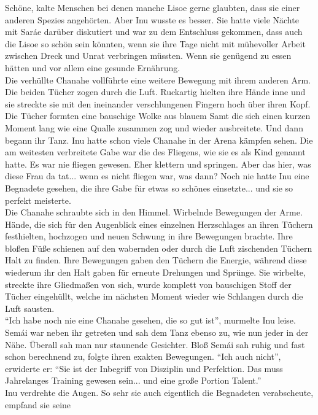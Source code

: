 Schöne, kalte Menschen bei denen manche Lisoe gerne glaubten, dass sie einer anderen Spezies 
angehörten. Aber Inu wusste es besser. Sie hatte viele Nächte mit Saráe darüber diskutiert und war 
zu dem Entschluss gekommen, dass auch die Lisoe so schön sein könnten, wenn sie ihre Tage nicht mit 
mühevoller Arbeit zwischen Dreck und Unrat verbringen müssten. Wenn sie genügend zu essen hätten 
und vor allem eine gesunde Ernährung. \\
Die verhüllte Chanahe vollführte eine weitere Bewegung mit ihrem anderen Arm. Die beiden Tücher 
zogen durch die Luft. Ruckartig hielten ihre Hände inne und sie streckte sie mit den ineinander 
verschlungenen Fingern hoch über ihren Kopf. Die Tücher formten eine bauschige Wolke aus blauem 
Samt die sich einen kurzen Moment lang wie eine Qualle zusammen zog und wieder ausbreitete. Und 
dann begann ihr Tanz. Inu hatte schon viele Chanahe in der Arena kämpfen sehen. Die am weitesten 
verbreitete Gabe war die des Fliegens, wie sie es als Kind genannt hatte. Es war nie fliegen 
gewesen. Eher klettern und springen. Aber das hier, was diese Frau da tat... wenn es nicht fliegen 
war, was dann? Noch nie hatte Inu eine Begnadete gesehen, die ihre Gabe für etwas so schönes 
einsetzte... und sie so perfekt meisterte. \\
Die Chanahe schraubte sich in den Himmel. Wirbelnde Bewegungen der Arme. Hände, die sich für den 
Augenblick eines einzelnen Herzschlages an ihren Tüchern festhielten, hochzogen und neuen Schwung 
in ihre Bewegungen brachte. Ihre bloßen Füße schienen auf den wabernden oder durch die Luft 
zischenden Tüchern Halt zu finden. Ihre Bewegungen gaben den Tüchern die Energie, während diese 
wiederum ihr den Halt gaben für erneute Drehungen und Sprünge. Sie wirbelte, streckte 
ihre Gliedmaßen von sich, wurde komplett von bauschigen Stoff der Tücher eingehüllt, welche im 
nächsten Moment wieder wie Schlangen durch die Luft sausten.\\
``Ich habe noch nie eine Chanahe gesehen, die so gut ist'', murmelte Inu leise.\\
Semái war neben ihr getreten und sah dem Tanz ebenso zu, wie nun jeder in der Nähe. Überall sah man 
nur staunende Gesichter. Bloß Semái sah ruhig und fast schon berechnend zu, folgte ihren exakten 
Bewegungen. ``Ich auch nicht'', erwiderte er: ``Sie ist der Inbegriff von Disziplin und Perfektion. 
Das muss Jahrelanges Training gewesen sein... und eine große Portion Talent.''\\
Inu verdrehte die Augen. So sehr sie auch eigentlich die Begnadeten verabscheute, empfand sie seine 

